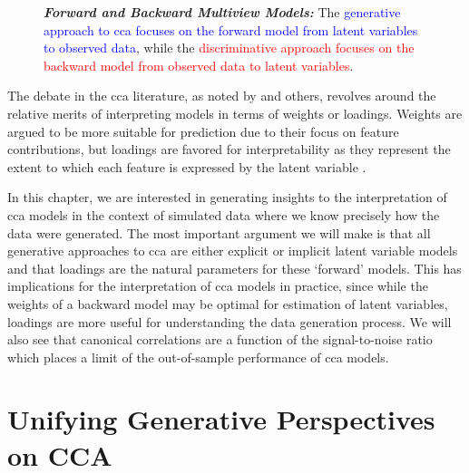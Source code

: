 \begin{figure}
    \centering
    \caption[Forward and Backward Multiview Models]{\textit{\textbf{Forward and Backward Multiview Models:}} The \textcolor{blue}{generative approach to \acrshort{cca} focuses on the forward model from latent variables to observed data}, while the \textcolor{red}{discriminative approach focuses on the backward model from observed data to latent variables}.}\label{fig:forward-backward-models}
\end{figure}

The debate in the \acrshort{cca} literature, as noted by \citet{gu2018simultaneous} and others, revolves around the relative merits of interpreting models in terms of weights or loadings.
Weights are argued to be more suitable for prediction due to their focus on feature contributions, but loadings are favored for interpretability as they represent the extent to which each feature is expressed by the latent variable \citep{haufe2014interpretation, alpert1972interpretation}.

In this chapter, we are interested in generating insights to the interpretation of \acrshort{cca} models in the context of simulated data where we know precisely how the data were generated.
The most important argument we will make is that all generative approaches to \acrshort{cca} are either explicit or implicit latent variable models and that loadings are the natural parameters for these `forward' models.
This has implications for the interpretation of \acrshort{cca} models in practice, since while the weights of a backward model may be optimal for estimation of latent variables, loadings are more useful for understanding the data generation process.
We will also see that canonical correlations are a function of the signal-to-noise ratio which places a limit of the out-of-sample performance of \acrshort{cca} models.

\section{Unifying Generative Perspectives on CCA}\label{sec:generative-perspectives}


